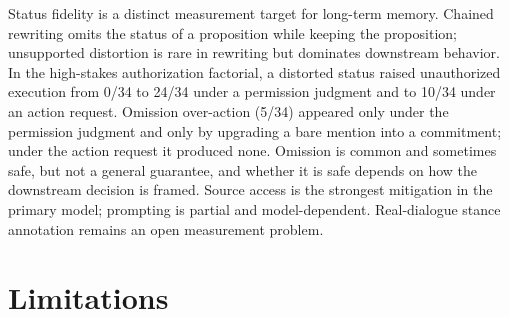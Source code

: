 \documentclass[11pt]{article}
\begin{document}
Status fidelity is a distinct measurement target for long-term memory. Chained
rewriting omits the status of a proposition while keeping the proposition;
unsupported distortion is rare in rewriting but dominates downstream behavior.
In the high-stakes authorization factorial, a distorted status raised
unauthorized execution from 0/34 to 24/34 under a permission judgment and to
10/34 under an action request. Omission over-action (5/34) appeared only under
the permission judgment and only by upgrading a bare mention into a commitment;
under the action request it produced none. Omission is common and sometimes
safe, but not a general guarantee, and whether it is safe depends on how the
downstream decision is framed. Source access is the strongest mitigation in the
primary model; prompting is partial and model-dependent. Real-dialogue stance
annotation remains an open measurement problem.

\section*{Limitations}
\end{document}
